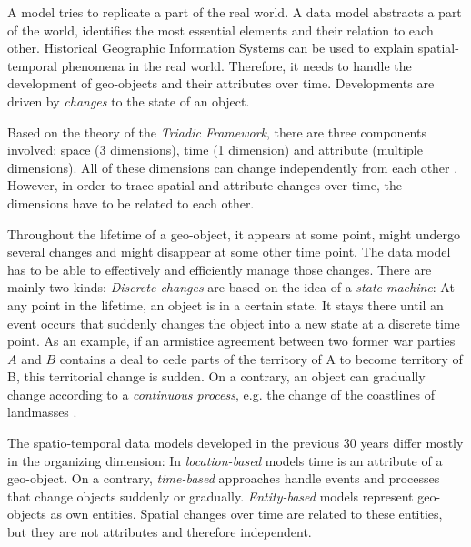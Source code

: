 A model tries to replicate a part of the real world. A data model abstracts a part of the world, identifies the most essential elements and their relation to each other. Historical Geographic Information Systems can be used to explain spatial-temporal phenomena in the real world. Therefore, it needs to handle the development of geo-objects and their attributes over time. Developments are driven by \emph{changes} to the state of an object.

Based on the theory of the \emph{Triadic Framework}, there are three components involved: space (3 dimensions), time (1 dimension) and attribute (multiple dimensions). All of these dimensions can change independently from each other
\cite[p. 53]{ott2001time}.
However, in order to trace spatial and attribute changes over time, the dimensions have to be related to each other.


Throughout the lifetime of a geo-object, it appears at some point, might undergo several changes and might disappear at some other time point. The data model has to be able to effectively and efficiently manage those changes. There are mainly two kinds: \emph{Discrete changes} are based on the idea of a \emph{state machine}: At any point in the lifetime, an object is in a certain state. It stays there until an event occurs that suddenly changes the object into a new state at a discrete time point. As an example, if an armistice agreement between two former war parties $A$ and $B$ contains a deal to cede parts of the territory of A to become territory of B, this territorial change is sudden. On a contrary, an object can gradually change according to a \emph{continuous process}, e.g. the change of the coastlines of landmasses
\cite{peuquet99}.

The spatio-temporal data models developed in the previous 30 years differ mostly in the organizing dimension: In \emph{location-based} models time is an attribute of a geo-object. On a contrary, \emph{time-based} approaches handle events and processes that change objects suddenly or gradually. \emph{Entity-based} models represent geo-objects as own entities. Spatial changes over time are related to these entities, but they are not attributes and therefore independent.



